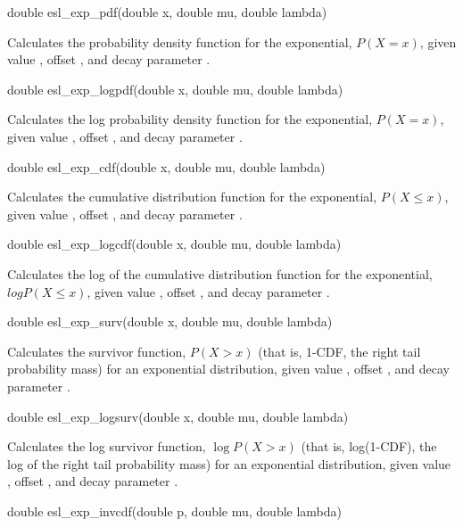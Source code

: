 \begin{sreapi}
\hypertarget{func:esl_exp_pdf()}
{\item[double esl\_exp\_pdf(double x, double mu, double lambda)]}

Calculates the probability density function for the
exponential, $P(X=x)$, given value , offset ,
and decay parameter .


\hypertarget{func:esl_exp_logpdf()}
{\item[double esl\_exp\_logpdf(double x, double mu, double lambda)]}

Calculates the log probability density function for the
exponential, $P(X=x)$, given value , offset ,
and decay parameter .


\hypertarget{func:esl_exp_cdf()}
{\item[double esl\_exp\_cdf(double x, double mu, double lambda)]}

Calculates the cumulative distribution function for the
exponential, $P(X \leq x)$, given value , offset ,
and decay parameter .


\hypertarget{func:esl_exp_logcdf()}
{\item[double esl\_exp\_logcdf(double x, double mu, double lambda)]}

Calculates the log of the cumulative distribution function
for the exponential, $log P(X \leq x)$, given value ,
offset , and decay parameter .


\hypertarget{func:esl_exp_surv()}
{\item[double esl\_exp\_surv(double x, double mu, double lambda)]}

Calculates the survivor function, $P(X>x)$ (that is, 1-CDF,
the right tail probability mass) for an exponential distribution,
given value , offset , and decay parameter .


\hypertarget{func:esl_exp_logsurv()}
{\item[double esl\_exp\_logsurv(double x, double mu, double lambda)]}

Calculates the log survivor function, $\log P(X>x)$ (that is,
log(1-CDF), the log of the right tail probability mass) for an 
exponential distribution, given value , offset , and 
decay parameter .


\hypertarget{func:esl_exp_invcdf()}
{\item[double esl\_exp\_invcdf(double p, double mu, double lambda)]}


\end{sreapi}
